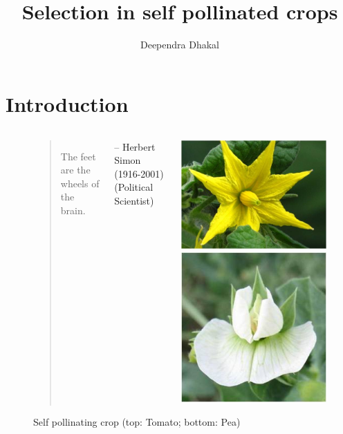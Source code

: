 \documentclass[11pt,ignorenonframetext,aspectratio=169]{beamer}
\title[]{Selection in self pollinated crops}
\author[
        Deependra Dhakal
    ]{Deependra Dhakal}
\institute[
    ]{
    Agriculture and Forestry University\\
\textit{ddhakal.rookie@gmail.com}\\
\url{https://rookie.rbind.io}
    }
\date[
      
  ]{
    }
\begin{document}
  \begin{frame}[plain]
  \titlepage
  \end{frame}



\hypertarget{introduction}{%
\section{Introduction}\label{introduction}}

\begin{frame}{}
\protect\hypertarget{section}{}
\begin{figure}
  \begin{columns}[T,onlytextwidth,c]
  \begin{quote}
  \footnotesize
  The feet are the wheels of the brain.
  \end{quote}
  \scriptsize \hfill\raggedright -- Herbert Simon (1916-2001) (Political Scientist)
  \begin{center}
  \includegraphics[width=0.65\linewidth]{./images/self_tomato_flower.jpg}
  \includegraphics[width=0.60\linewidth]{./images/self_pollinated_pea.jpg}
  \end{center}
  
  \caption{\newline \scriptsize Self pollinating crop (top: Tomato; bottom: Pea)}
  \label{fig:self-pollinating-crop}
  
  \end{columns}
\end{figure}
\end{frame}
\end{document}
